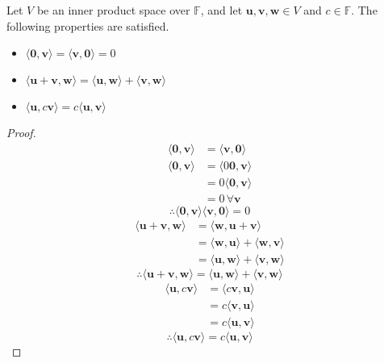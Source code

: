 \begin{theorem}
    Let \(V\) be an inner product space over \(\mathbb{F} \), and let \(\mathbf{u} ,\mathbf{v} ,\mathbf{w} \in V\) and \(c\in\mathbb{F} \). The following properties are satisfied. 
    \begin{itemize}
        \item \(\langle \mathbf{0},\mathbf{v}   \rangle= \langle \mathbf{v} ,\mathbf{0}  \rangle =0 \) 
        \item \(\langle \mathbf{u} +\mathbf{v} ,\mathbf{w}  \rangle=\langle \mathbf{u} ,\mathbf{w}  \rangle+\langle \mathbf{v} ,\mathbf{w}  \rangle   \) 
        \item \(\langle \mathbf{u} ,c \mathbf{v}  \rangle=c\langle \mathbf{u} ,\mathbf{v}  \rangle  \) 
    \end{itemize}
\end{theorem}
\begin{proof}
    \begin{align*}
        \langle \mathbf{0},\mathbf{v}   \rangle &= \langle \mathbf{v},\mathbf{0}  \rangle\\  
        \langle \mathbf{0},\mathbf{v}   \rangle&= \langle 0 \mathbf{0},\mathbf{v}   \rangle \\
        &= 0\langle \mathbf{0},\mathbf{v}   \rangle \\
        &=0 \,\forall \mathbf{v} 
    \end{align*}
    \[
        \therefore \langle \mathbf{0},\mathbf{v}   \rangle \langle \mathbf{v} ,\mathbf{0}  \rangle =0
    \]
    \begin{align*}
        \langle \mathbf{u} +\mathbf{v} ,\mathbf{w}  \rangle&=\langle \mathbf{w} ,\mathbf{u} +\mathbf{v}  \rangle \\
        &= \langle \mathbf{w} ,\mathbf{u}  \rangle+\langle \mathbf{w} ,\mathbf{v}  \rangle  \\
        &=\langle \mathbf{u} ,\mathbf{w}  \rangle+\langle \mathbf{v} ,\mathbf{w}  \rangle  
    \end{align*}
    \[
        \therefore \langle \mathbf{u} +\mathbf{v} ,\mathbf{w}  \rangle=\langle \mathbf{u} ,\mathbf{w}  \rangle+\langle \mathbf{v} ,\mathbf{w}  \rangle   
    \]
    \begin{align*}
        \langle \mathbf{u} ,c \mathbf{v}  \rangle &= \langle c \mathbf{v} ,\mathbf{u}  \rangle \\
        &= c\langle \mathbf{v} ,\mathbf{u}  \rangle\\
        &= c\langle \mathbf{u} ,\mathbf{v}  \rangle  
    \end{align*}
    \[
        \therefore \langle \mathbf{u} ,c \mathbf{v}  \rangle =c\langle \mathbf{u} ,\mathbf{v}  \rangle 
    \]
\end{proof}
